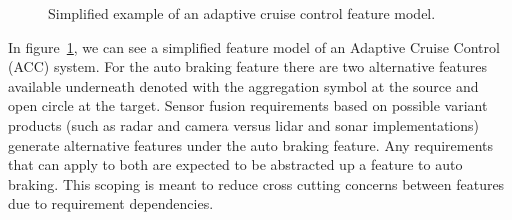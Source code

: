 \begin{figure}
	\centering
	
	\caption{Simplified example of an adaptive cruise control feature model.}
	\label{fig:acc_fm}
\end{figure}

In figure~\ref{fig:acc_fm}, we can see a simplified feature model of an Adaptive Cruise Control (ACC) system. For the auto braking feature there are two alternative features available underneath denoted with the aggregation symbol at the source and open circle at the target. Sensor fusion requirements based on possible variant products (such as radar and camera versus lidar and sonar implementations) generate alternative features under the auto braking feature. Any requirements that can apply to both are expected to be abstracted up a feature to auto braking. This scoping is meant to reduce cross cutting concerns between features due to requirement dependencies.






